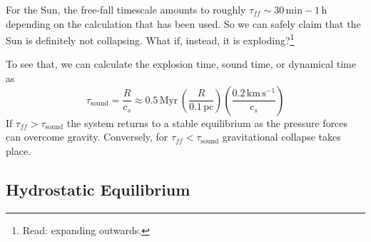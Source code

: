 \par For the Sun, the free-fall timescale amounts to roughly $\tau_{ff} \sim 30\,\text{min}-1\,\text{h}$ depending on the calculation that has been used. So we can safely claim that the Sun is definitely not collapsing. What if, instead, it is exploding?\footnote{Read: expanding outwards.}
\par To see that, we can calculate the explosion time, sound time, or dynamical time as 
\begin{equation}
    \tau_{\text{sound}} = \frac{R}{c_{s}} \approx 0.5\,\text{Myr}\,\left(\frac{R}{0.1\,\text{pc}}\right)\left(\frac{0.2\,\text{km}\,\text{s}^{-1}}{c_{s}}\right)
    \label{eq:sound_time}
\end{equation}
If $\tau_{ff}>\tau_{\text{sound}}$ the system returns to a stable equilibrium as the pressure forces can overcome gravity. Conversely, for $\tau_{ff}<\tau_{\text{sound}}$ gravitational collapse takes place.

\subsection{Hydrostatic Equilibrium}

